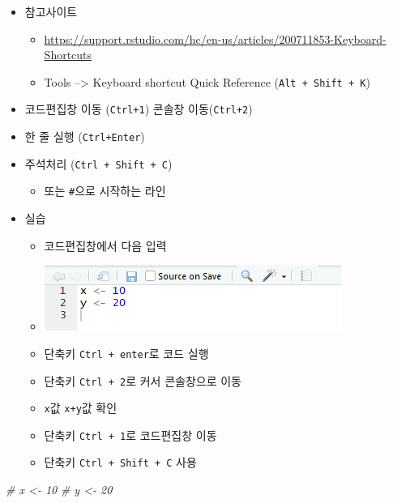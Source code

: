 \documentclass[
]{book}
\newenvironment{Shaded}{\begin{snugshade}}{\end{snugshade}}
\newcommand{\CommentTok}[1]{\textcolor[rgb]{0.56,0.35,0.01}{\textit{#1}}}
\providecommand{\tightlist}{%
  \setlength{\itemsep}{0pt}\setlength{\parskip}{0pt}}
\begin{document}
\begin{itemize}
\tightlist
\item
  참고사이트

  \begin{itemize}
  \tightlist
  \item
    \url{https://support.rstudio.com/hc/en-us/articles/200711853-Keyboard-Shortcuts}
  \item
    Tools --\textgreater{} Keyboard shortcut Quick Reference (\texttt{Alt\ +\ Shift\ +\ K})
  \end{itemize}
\item
  코드편집창 이동 (\texttt{Ctrl+1}) 콘솔창 이동(\texttt{Ctrl+2})
\item
  한 줄 실행 (\texttt{Ctrl+Enter})
\item
  주석처리 (\texttt{Ctrl\ +\ Shift\ +\ C})

  \begin{itemize}
  \tightlist
  \item
    또는 \texttt{\#}으로 시작하는 라인
  \end{itemize}
\item
  실습

  \begin{itemize}
  \tightlist
  \item
    코드편집창에서 다음 입력
  \item
    \includegraphics{images/01/01-14.PNG}\\
  \item
    단축키 \texttt{Ctrl\ +\ enter}로 코드 실행
  \item
    단축키 \texttt{Ctrl\ +\ 2}로 커서 콘솔창으로 이동
  \item
    \texttt{x}값 \texttt{x+y}값 확인
  \item
    단축키 \texttt{Ctrl\ +\ 1}로 코드편집창 이동
  \item
    단축키 \texttt{Ctrl\ +\ Shift\ +\ C} 사용
  \end{itemize}
\end{itemize}

\begin{Shaded}
\begin{Highlighting}[]
\CommentTok{\# x <{-} 10}
\CommentTok{\# y <{-} 20}
\end{Highlighting}
\end{Shaded}
\end{document}
